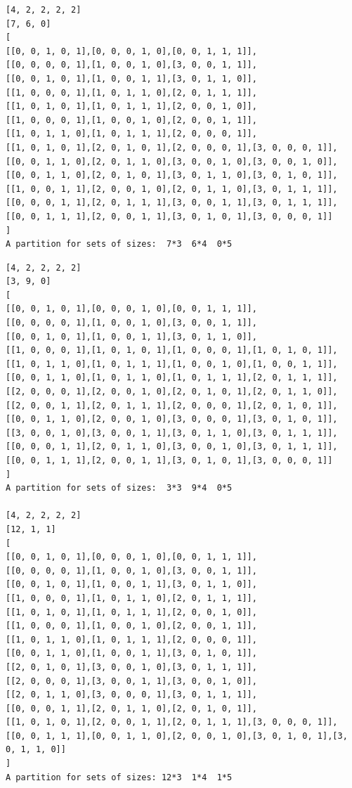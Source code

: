 \documentclass[final]{dmtcs-episciences}
\begin{document}
\begin{appendices}
\begin{verbatim}
[4, 2, 2, 2, 2]
[7, 6, 0]
[
[[0, 0, 1, 0, 1],[0, 0, 0, 1, 0],[0, 0, 1, 1, 1]],
[[0, 0, 0, 0, 1],[1, 0, 0, 1, 0],[3, 0, 0, 1, 1]],
[[0, 0, 1, 0, 1],[1, 0, 0, 1, 1],[3, 0, 1, 1, 0]],
[[1, 0, 0, 0, 1],[1, 0, 1, 1, 0],[2, 0, 1, 1, 1]],
[[1, 0, 1, 0, 1],[1, 0, 1, 1, 1],[2, 0, 0, 1, 0]],
[[1, 0, 0, 0, 1],[1, 0, 0, 1, 0],[2, 0, 0, 1, 1]],
[[1, 0, 1, 1, 0],[1, 0, 1, 1, 1],[2, 0, 0, 0, 1]],
[[1, 0, 1, 0, 1],[2, 0, 1, 0, 1],[2, 0, 0, 0, 1],[3, 0, 0, 0, 1]],
[[0, 0, 1, 1, 0],[2, 0, 1, 1, 0],[3, 0, 0, 1, 0],[3, 0, 0, 1, 0]],
[[0, 0, 1, 1, 0],[2, 0, 1, 0, 1],[3, 0, 1, 1, 0],[3, 0, 1, 0, 1]],
[[1, 0, 0, 1, 1],[2, 0, 0, 1, 0],[2, 0, 1, 1, 0],[3, 0, 1, 1, 1]],
[[0, 0, 0, 1, 1],[2, 0, 1, 1, 1],[3, 0, 0, 1, 1],[3, 0, 1, 1, 1]],
[[0, 0, 1, 1, 1],[2, 0, 0, 1, 1],[3, 0, 1, 0, 1],[3, 0, 0, 0, 1]]
]
A partition for sets of sizes:  7*3  6*4  0*5
\end{verbatim}

\newpage

\begin{verbatim} 
[4, 2, 2, 2, 2]
[3, 9, 0]
[
[[0, 0, 1, 0, 1],[0, 0, 0, 1, 0],[0, 0, 1, 1, 1]],
[[0, 0, 0, 0, 1],[1, 0, 0, 1, 0],[3, 0, 0, 1, 1]],
[[0, 0, 1, 0, 1],[1, 0, 0, 1, 1],[3, 0, 1, 1, 0]],
[[1, 0, 0, 0, 1],[1, 0, 1, 0, 1],[1, 0, 0, 0, 1],[1, 0, 1, 0, 1]],
[[1, 0, 1, 1, 0],[1, 0, 1, 1, 1],[1, 0, 0, 1, 0],[1, 0, 0, 1, 1]],
[[0, 0, 1, 1, 0],[1, 0, 1, 1, 0],[1, 0, 1, 1, 1],[2, 0, 1, 1, 1]],
[[2, 0, 0, 0, 1],[2, 0, 0, 1, 0],[2, 0, 1, 0, 1],[2, 0, 1, 1, 0]],
[[2, 0, 0, 1, 1],[2, 0, 1, 1, 1],[2, 0, 0, 0, 1],[2, 0, 1, 0, 1]],
[[0, 0, 1, 1, 0],[2, 0, 0, 1, 0],[3, 0, 0, 0, 1],[3, 0, 1, 0, 1]],
[[3, 0, 0, 1, 0],[3, 0, 0, 1, 1],[3, 0, 1, 1, 0],[3, 0, 1, 1, 1]],
[[0, 0, 0, 1, 1],[2, 0, 1, 1, 0],[3, 0, 0, 1, 0],[3, 0, 1, 1, 1]],
[[0, 0, 1, 1, 1],[2, 0, 0, 1, 1],[3, 0, 1, 0, 1],[3, 0, 0, 0, 1]]
]
A partition for sets of sizes:  3*3  9*4  0*5

[4, 2, 2, 2, 2]
[12, 1, 1]
[
[[0, 0, 1, 0, 1],[0, 0, 0, 1, 0],[0, 0, 1, 1, 1]],
[[0, 0, 0, 0, 1],[1, 0, 0, 1, 0],[3, 0, 0, 1, 1]],
[[0, 0, 1, 0, 1],[1, 0, 0, 1, 1],[3, 0, 1, 1, 0]],
[[1, 0, 0, 0, 1],[1, 0, 1, 1, 0],[2, 0, 1, 1, 1]],
[[1, 0, 1, 0, 1],[1, 0, 1, 1, 1],[2, 0, 0, 1, 0]],
[[1, 0, 0, 0, 1],[1, 0, 0, 1, 0],[2, 0, 0, 1, 1]],
[[1, 0, 1, 1, 0],[1, 0, 1, 1, 1],[2, 0, 0, 0, 1]],
[[0, 0, 1, 1, 0],[1, 0, 0, 1, 1],[3, 0, 1, 0, 1]],
[[2, 0, 1, 0, 1],[3, 0, 0, 1, 0],[3, 0, 1, 1, 1]],
[[2, 0, 0, 0, 1],[3, 0, 0, 1, 1],[3, 0, 0, 1, 0]],
[[2, 0, 1, 1, 0],[3, 0, 0, 0, 1],[3, 0, 1, 1, 1]],
[[0, 0, 0, 1, 1],[2, 0, 1, 1, 0],[2, 0, 1, 0, 1]],
[[1, 0, 1, 0, 1],[2, 0, 0, 1, 1],[2, 0, 1, 1, 1],[3, 0, 0, 0, 1]],
[[0, 0, 1, 1, 1],[0, 0, 1, 1, 0],[2, 0, 0, 1, 0],[3, 0, 1, 0, 1],[3, 0, 1, 1, 0]]
]
A partition for sets of sizes: 12*3  1*4  1*5


\end{verbatim}
\end{appendices}
\end{document}
